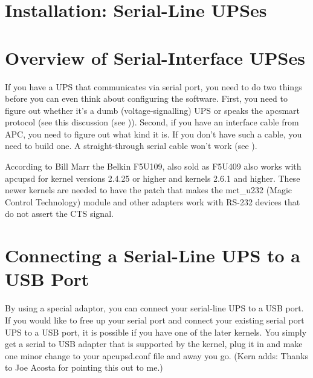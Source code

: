 {{{{{{{\section*{Installation: Serial-Line UPSes}

\label{Overview-of-Serial_002dInterface-UPSes}

\section*{Overview of Serial-Interface UPSes}

\label{index-Serial-UPSes-189}
If you have a UPS that communicates via serial port, you need to do two things
before you can even think about configuring the software. First, you need to
figure out whether it's a dumb (voltage-signalling) UPS or speaks the apcsmart
protocol (see this discussion (see 
)).  Second, if you have an interface
cable from APC, you need to figure out what kind it is.  If you don't have
such a cable, you need to build one.  A straight-through serial cable won't
work (see 
).  

According to Bill Marr the Belkin F5U109, also sold as F5U409 also works with
apcupsd for kernel versions 2.4.25 or higher and kernels 2.6.1 and higher. 
These newer kernels are needed to have the patch that makes the mct\_u232
(Magic Control Technology) module and other adapters work with RS-232 devices
that do not assert the CTS signal. 

\label{Connecting-a-Serial_002dLine-UPS-to-a-USB-Port}

\section*{Connecting a Serial-Line UPS to a USB Port}

\label{index-Serial-on-USB-190}
By using a special adaptor, you can connect your serial-line UPS to a USB
port. If you would like to free up your serial port and connect your existing
serial port UPS to a USB port, it is possible if you have one of the later
kernels. You simply get a serial to USB adapter that is supported by the
kernel, plug it in and make one minor change to your apcupsd.conf file and
away you go. (Kern adds: Thanks to Joe Acosta for pointing this out to me.)  

}}}}}}}
